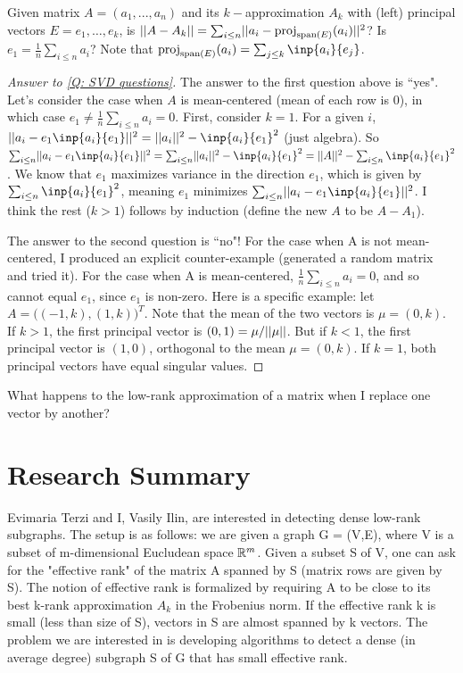 \documentclass{article}
\begin{document}
\begin{question}\label{Q: SVD questions}
    Given matrix $A = (a_1,...,a_n)$ and its $k-$approximation $A_k$ with (left) principal vectors $E = e_1,\dots,e_k$, is $\norm{A - A_k} = \sum_{i\leq n}\norm{a_i - \proj_{\vspan{E}}(a_i)}^2$? Is $e_1 = \frac{1}{n}\sum_{i\leq n}a_i$? Note that $\proj_{\vspan{E}}(a_i) = \sum_{j\leq k}\inp{a_i}{e_j}$.
\end{question}
\begin{proof}[Answer to \ref{Q: SVD questions}]
The answer to the first question above is ``yes". Let's consider the case when $A$ is mean-centered (mean of each row is 0), in which case $e_1 \neq \frac{1}{n}\sum_{i\leq n}a_i = 0$. First, consider $k=1$. For a given $i$, $\norm{a_i - e_1\inp{a_i}{e_1}}^2 = \norm{a_i}^2 - \inp{a_i}{e_1}^2$ (just algebra). So $\sum_{i\leq n}\norm{a_i - e_1\inp{a_i}{e_1}}^2 = \sum_{i\leq n}\norm{a_i}^2 - \inp{a_i}{e_1}^2 = \norm{A}^2-\sum_{i\leq n}\inp{a_i}{e_1}^2$. We know that $e_1$ maximizes variance in the direction $e_1$, which is given by $\sum_{i\leq n} \inp{a_i}{e_1}^2$, meaning $e_1$ minimizes $\sum_{i\leq n}\norm{a_i - e_1\inp{a_i}{e_1}}^2$. I think the rest ($k>1$) follows by induction (define the new $A$ to be $A-A_1$).

The answer to the second question is ``no"! For the case when A is not mean-centered, I produced an explicit counter-example (generated a random matrix and tried it). For the case when A is mean-centered, $\frac{1}{n}\sum_{i\leq n}a_i = 0$, and so cannot equal $e_1$, since $e_1$ is non-zero. Here is a specific example: let $A = \Big((-1,k),(1,k)\Big)^T$. Note that the mean of the two vectors is $\mu=(0,k)$. If $k>1$, the first principal vector is $(0,1) = \mu/||\mu||$. But if $k<1$, the first principal vector is $(1,0)$, orthogonal to the mean $\mu=(0,k)$. If $k=1$, both principal vectors have equal singular values.
\end{proof}
\begin{question}
    What happens to the low-rank approximation of a matrix when I replace one vector by another?
\end{question}

\section{Research Summary}
Evimaria Terzi and I, Vasily Ilin, are interested in detecting dense low-rank subgraphs.
The setup is as follows: we are given a graph G = (V,E), where V is a subset of m-dimensional Eucludean space $\mathbb{R}^m$. Given a subset S of V, one can ask for the "effective rank" of the matrix A spanned by S (matrix rows are given by S). The notion of effective rank is formalized by requiring A to be close to its best k-rank approximation $A_k$ in the Frobenius norm. If the effective rank k is small (less than size of S), vectors in S are almost spanned by k vectors. The problem we are interested in is developing algorithms to detect a dense (in average degree) subgraph S of G that has small effective rank.
\end{document}
